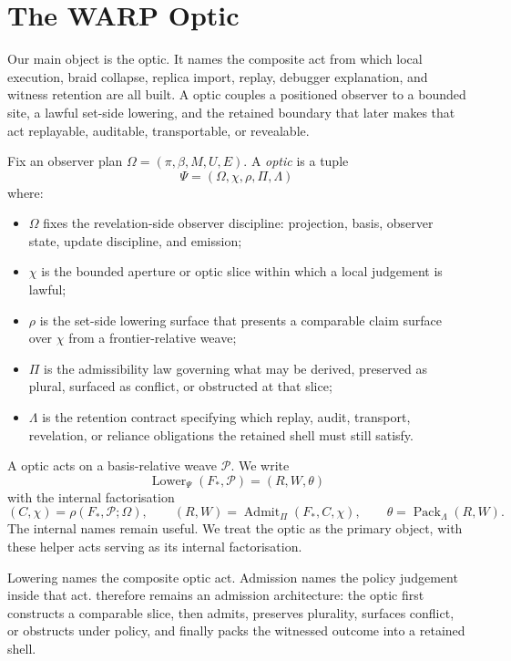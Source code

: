 \documentclass{aion}
\begin{document}
\clearpage
\section{The WARP Optic}
\label{sec:warp-optic}

Our main object is the \WARP{} optic. It names the composite act from which
local execution, braid collapse, replica import, replay, debugger explanation,
and witness retention are all built. A \WARP{} optic couples a positioned
observer to a bounded site, a lawful set-side lowering, and the retained
boundary that later makes that act replayable, auditable, transportable, or
revealable.

\begin{definition}
\label{def:warp-optic}
	Fix an observer plan \(\Omega = (\pi,\beta,M,U,E)\). A
	\emph{\WARP{} optic} is a tuple
	\[
		\Psi = (\Omega,\chi,\rho,\Pi,\Lambda)
	\]
	where:
	\begin{itemize}[leftmargin=*]
		\item \(\Omega\) fixes the revelation-side observer discipline: projection,
		      basis, observer state, update discipline, and emission;
		\item \(\chi\) is the bounded aperture or optic slice within which a local
		      judgement is lawful;
		\item \(\rho\) is the set-side lowering surface that presents a comparable
		      claim surface over \(\chi\) from a frontier-relative weave;
		\item \(\Pi\) is the admissibility law governing what may be derived,
		      preserved as plural, surfaced as conflict, or obstructed at that slice;
		\item \(\Lambda\) is the retention contract specifying which replay, audit,
		      transport, revelation, or reliance obligations the retained shell must still
		      satisfy.
	\end{itemize}
\end{definition}

A \WARP{} optic acts on a basis-relative weave
\(\mathcal{P}\). We write
\[
	\operatorname{Lower}_{\Psi}(F_*, \mathcal{P}) = (R,W,\theta)
\]
with the internal factorisation
\[
	(C,\chi) = \rho(F_*, \mathcal{P}; \Omega),
	\qquad
	(R,W) = \operatorname{Admit}_{\Pi}(F_*, C, \chi),
	\qquad
	\theta = \operatorname{Pack}_{\Lambda}(R, W).
\]
The internal names remain useful. We treat the optic as the primary object,
with these helper acts serving as its internal factorisation.

Lowering names the composite optic act. Admission names the policy judgement
inside that act. \WARP{} therefore remains an admission architecture: the
optic first constructs a comparable slice, then admits, preserves plurality,
surfaces conflict, or obstructs under policy, and finally packs the witnessed
outcome into a retained shell.
\end{document}
